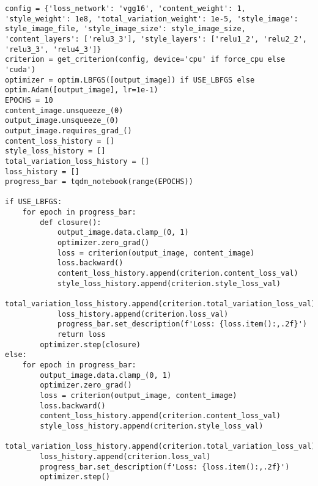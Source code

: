 \begin{listing}[H]
\begin{verbatim}
config = {'loss_network': 'vgg16', 'content_weight': 1, 'style_weight': 1e8, 'total_variation_weight': 1e-5, 'style_image': style_image_file, 'style_image_size': style_image_size, 'content_layers': ['relu3_3'], 'style_layers': ['relu1_2', 'relu2_2', 'relu3_3', 'relu4_3']}
criterion = get_criterion(config, device='cpu' if force_cpu else 'cuda')
optimizer = optim.LBFGS([output_image]) if USE_LBFGS else optim.Adam([output_image], lr=1e-1)
EPOCHS = 10
content_image.unsqueeze_(0)
output_image.unsqueeze_(0)
output_image.requires_grad_()
content_loss_history = []
style_loss_history = []
total_variation_loss_history = []
loss_history = []
progress_bar = tqdm_notebook(range(EPOCHS))

if USE_LBFGS:
    for epoch in progress_bar:
        def closure():
            output_image.data.clamp_(0, 1)
            optimizer.zero_grad()
            loss = criterion(output_image, content_image)
            loss.backward()
            content_loss_history.append(criterion.content_loss_val)
            style_loss_history.append(criterion.style_loss_val)
            total_variation_loss_history.append(criterion.total_variation_loss_val)
            loss_history.append(criterion.loss_val)
            progress_bar.set_description(f'Loss: {loss.item():,.2f}')
            return loss
        optimizer.step(closure)
else:
    for epoch in progress_bar:
        output_image.data.clamp_(0, 1)
        optimizer.zero_grad()
        loss = criterion(output_image, content_image)
        loss.backward()
        content_loss_history.append(criterion.content_loss_val)
        style_loss_history.append(criterion.style_loss_val)
        total_variation_loss_history.append(criterion.total_variation_loss_val)
        loss_history.append(criterion.loss_val)
        progress_bar.set_description(f'Loss: {loss.item():,.2f}')
        optimizer.step()
\end{verbatim}
\label{lst:notebook_neural_style_transfer_2}
\end{listing}


